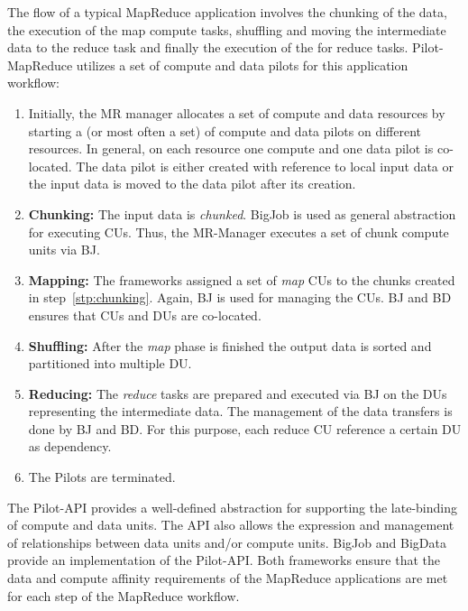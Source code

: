 \documentclass{acm_proc_article-sp}
\newcommand{\pilots}{Pilots\xspace}
\begin{document}
The flow of a typical MapReduce application involves the chunking of the data,
the execution of the map compute tasks, shuffling and moving the intermediate
data to the reduce task and finally the execution of the for reduce tasks.
Pilot-MapReduce utilizes a set of compute and data pilots for this application
workflow:
\begin{enumerate}
	\item Initially, the MR manager allocates a set of compute and data 
	resources by starting a (or most often a set) of compute and data pilots 
	on different resources. In general, on each resource one compute 
	and one data pilot is co-located. The data pilot is either created with 
	reference to local input data or the input data is moved to the data pilot 
	after its creation. 

	\item \textbf{Chunking:} The input data is {\it chunked}. BigJob is used 
	as general 
	abstraction for executing CUs. Thus, the MR-Manager executes a set of 
	chunk compute units via BJ. \label{stp:chunking}
	
	\item \textbf{Mapping:} The frameworks assigned a set of {\it map} CUs to 
	the chunks created 
	in step~\ref{stp:chunking}. Again, BJ is used for managing the CUs. BJ and 
	BD ensures that CUs and DUs are co-located.
	
	\item \textbf{Shuffling:} After the {\it map} phase is finished the output 
	data is sorted and partitioned into multiple DU.
	
	\item \textbf{Reducing:} The {\it reduce} tasks are prepared and 
	executed via BJ on the DUs representing the intermediate data. The 
	management of the data transfers is done by BJ and BD. For this purpose, 
	each reduce CU reference a certain DU as dependency.
	
	\item The \pilots are terminated.

\end{enumerate}

The Pilot-API provides a well-defined abstraction for supporting the
late-binding of compute and data units. The API also allows the expression and
management of relationships between data units and/or compute units. BigJob
and BigData provide an implementation of the Pilot-API. Both frameworks ensure
that the data and compute affinity requirements of the MapReduce applications
are met for each step of the MapReduce workflow.
\end{document}
